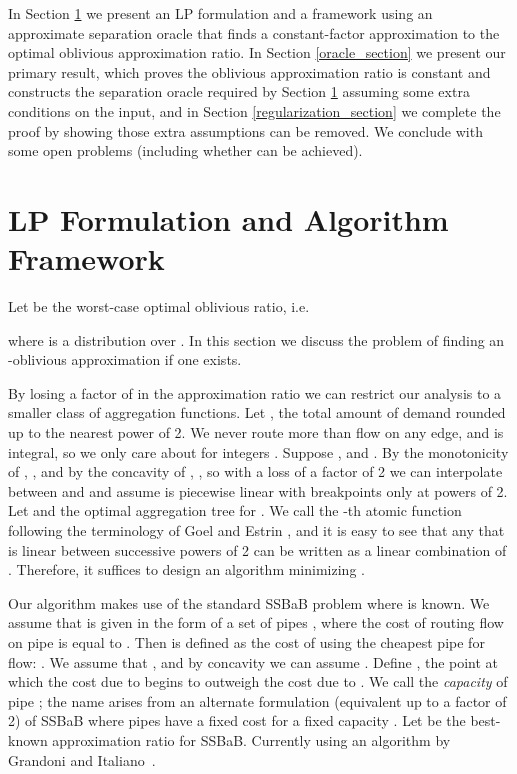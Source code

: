 \documentclass[11pt]{article}
\begin{document}
In Section \ref{algorithm_section} we present an LP formulation and a
framework using an approximate separation oracle that finds a
constant-factor approximation to the optimal oblivious approximation ratio.
In Section \ref{oracle_section} we present our primary result, which proves
the oblivious approximation ratio is constant and constructs the separation
oracle required by Section \ref{algorithm_section} assuming some extra
conditions on the input, and in Section \ref{regularization_section} we
complete the proof by showing those extra assumptions can be removed. We
conclude with some open problems (including whether  can be
achieved).

\section{LP Formulation and Algorithm Framework}
\label{algorithm_section}

Let  be the worst-case optimal oblivious ratio, i.e.\

where  is a distribution over .  In this section we discuss the problem of finding an -oblivious approximation if one exists.  

By losing a factor of  in the approximation ratio we can restrict our analysis to a smaller class of aggregation functions.
Let , the total amount of demand rounded up to the nearest power of 2.  We never route more than  flow on any edge, and  is integral, so we only care about  for integers .  Suppose , and .  By the monotonicity of , , and by the concavity of , , so with a loss of a factor of 2 we can interpolate between  and  and assume  is piecewise linear with breakpoints only at powers of 2.  Let  and  the optimal aggregation tree for .  We call  the -th atomic function following the terminology of Goel and Estrin \cite{goel2003soc}, and it is easy to see that any  that is linear between successive powers of 2 can be written as a linear combination of .  Therefore, it suffices to design an algorithm  minimizing .

Our algorithm makes use of the standard SSBaB problem where  is known.  We assume that  is given in the form of a set of  pipes , where the cost of routing  flow on pipe  is equal to .  Then  is defined as the cost of using the cheapest pipe for  flow: .  We assume that , and by concavity we can assume .  Define , the point at which the cost due to  begins to outweigh the cost due to .   We call  the \emph{capacity} of pipe ; the name arises from an alternate formulation
(equivalent up to a factor of 2)
of SSBaB where pipes have a fixed cost  for a fixed capacity .  Let  be the best-known approximation ratio for SSBaB.  Currently  using an algorithm by Grandoni and Italiano~\cite{grandoni2006ias}.
\end{document}
